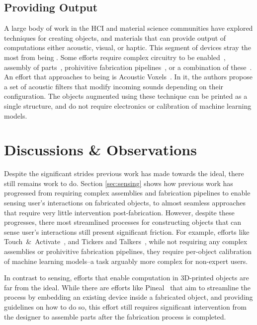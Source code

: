     \subsection{Providing Output} \label{sec:output}
      A large body of work in the HCI and material science communities have
      explored techniques for creating objects, and materials that can provide
      output of computations either acoustic, visual, or haptic. This segment of
      devices stray the most from being \pap. Some efforts require complex
      circuitry to be enabled~\cite{Slyper:2012, Groeger:2016}, assembly of
      parts~\cite{Ion:2017}, prohivitive fabrication pipelines~\cite{Kong:2014,
      Peng:2016, Brockmeyer:2013}, or a combination of these~\cite{Vazquez:2015,
      MacCurdy:2016, Neidlinger:2017}. An effort that approaches to being \pap
      is Acoustic Voxels~\cite{Li:2016}. In it, the authors propose a set of
      acoustic filters that modify incoming sounds depending on their
      configuration. The objects augmented using these technique can be printed
      as a single structure, and do not require electronics or calibration of
      machine learning models.

  \section{Discussions \& Observations}
    Despite the significant strides previous work has made towards the \papf
    ideal, there still remains work to do. Section \ref{sec:sensing} shows how
    previous work has progressed from requiring complex assemblies and
    fabrication pipelines to enable sensing user's interactions on fabricated
    objects, to almost seamless approaches that require very little intervention
    post-fabrication. However, despite these progresses, there most streamlined
    processes for constructing objects that can sense user's interactions still
    present significant friction. For example, efforts like
    Touch~\&~Activate~\cite{}, and Tickers and Talkers~\cite{}, while not
    requiring any complex assemblies or prohivitive fabrication pipelines, they
    require per-object calibration of machine learning models--a task arguably
    more complex for non-expert users. 

    In contrast to sensing, efforts that enable computation in 3D-printed
    objects are far from the \papf ideal. While there are efforts like
    Pineal~\cite{Ledo:2017} that aim to streamline the process by embedding an
    existing device inside a fabricated object, and providing guidelines on how
    to do so, this effort still requires significant intervention from the
    designer to assemble parts after the fabrication process is completed.


